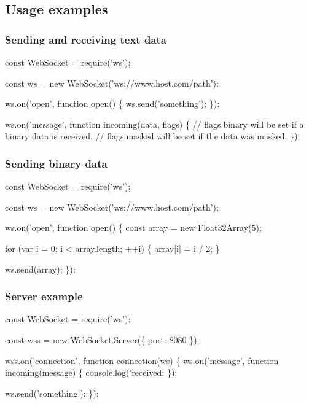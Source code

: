 \subsection*{Usage examples}

\subsubsection*{Sending and receiving text data}


\begin{DoxyCode}
const WebSocket = require('ws');

const ws = new WebSocket('ws://www.host.com/path');

ws.on('open', function open() \{
  ws.send('something');
\});

ws.on('message', function incoming(data, flags) \{
  // flags.binary will be set if a binary data is received.
  // flags.masked will be set if the data was masked.
\});
\end{DoxyCode}


\subsubsection*{Sending binary data}


\begin{DoxyCode}
const WebSocket = require('ws');

const ws = new WebSocket('ws://www.host.com/path');

ws.on('open', function open() \{
  const array = new Float32Array(5);

  for (var i = 0; i < array.length; ++i) \{
    array[i] = i / 2;
  \}

  ws.send(array);
\});
\end{DoxyCode}


\subsubsection*{Server example}


\begin{DoxyCode}
const WebSocket = require('ws');

const wss = new WebSocket.Server(\{ port: 8080 \});

wss.on('connection', function connection(ws) \{
  ws.on('message', function incoming(message) \{
    console.log('received: %
  \});

  ws.send('something');
\});
\end{DoxyCode}


